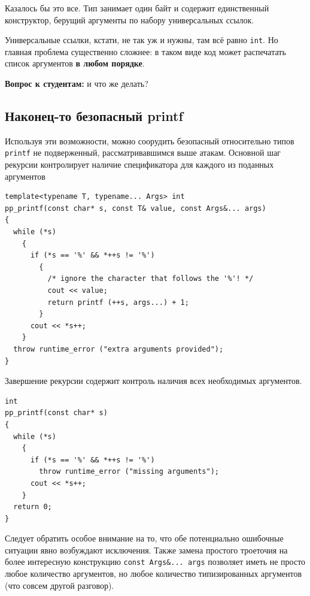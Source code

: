 \documentclass[a4paper,12pt,oneside]{book}
\newif\ifanswers
\begin{document}
Казалось бы это все. Тип занимает один байт и содержит единственный конструктор, берущий аргументы по набору универсальных ссылок.

Универсальные ссылки, кстати, не так уж и нужны, там всё равно \lstinline!int!. Но главная проблема существенно сложнее: в таком виде код может распечатать список аргументов \textbf{в любом порядке}.

\textbf{Вопрос к студентам:} и что же делать?

\ifanswers
Правильный ответ: вспомнить про синтаксис инициализации и сделать его правильно.

\begin{lstlisting}
struct expand_type
{
  expand_type(std::initializer_list<int>) {}
};
\end{lstlisting}
\fi

\subsection{Наконец-то безопасный printf}\label{TypesafePrintf}

Используя эти возможности, можно соорудить безопасный относительно типов \lstinline!printf! не подверженный, рассматривавшимся выше атакам. Основной шаг рекурсии контролирует наличие спецификатора для каждого из поданных аргументов

\begin{lstlisting}
template<typename T, typename... Args> int
pp_printf(const char* s, const T& value, const Args&... args)
{
  while (*s)
    {
      if (*s == '%' && *++s != '%')
        {
          /* ignore the character that follows the '%'! */
          cout << value;
          return printf (++s, args...) + 1;
        }
      cout << *s++;
    }
  throw runtime_error ("extra arguments provided");
}
\end{lstlisting}

Завершение рекурсии содержит контроль наличия всех необходимых аргументов.

\begin{lstlisting}
int
pp_printf(const char* s) 
{
  while (*s) 
    {
      if (*s == '%' && *++s != '%')
        throw runtime_error ("missing arguments");
      cout << *s++;
    }
  return 0;
}
\end{lstlisting}

Следует обратить особое внимание на то, что обе потенциально ошибочные ситуации явно возбуждают исключения. Также замена простого троеточия на более интересную конструкцию \lstinline!const Args&... args! позволяет иметь не просто любое количество аргументов, но любое количество типизированных аргументов (что совсем другой разговор).
\end{document}
